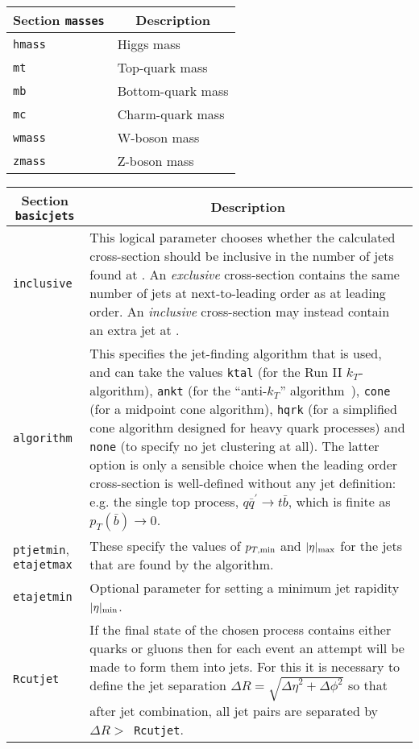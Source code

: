 	\begin{longtable}{p{1.5cm}p{12cm}}
		\toprule
		\multicolumn{1}{c}{{\textbf{Section} \texttt{masses}}} & \multicolumn{1}{c}{{\textbf{Description}}} \\ 
		\midrule
		\texttt{hmass} & Higgs mass \\
		\texttt{mt} & Top-quark mass \\
		\texttt{mb} & Bottom-quark mass \\
		\texttt{mc} & Charm-quark mass \\
		\texttt{wmass} & W-boson mass \\
		\texttt{zmass} & Z-boson mass \\
		\bottomrule
	\end{longtable}

	\begin{longtable}{p{1.5cm}p{12cm}}
		\toprule
		\multicolumn{1}{c}{{\textbf{Section} \texttt{basicjets}}} & \multicolumn{1}{c}{{\textbf{Description}}} \\ 
		\midrule
		\texttt{inclusive} &
		This logical parameter chooses whether the
		calculated cross-section should be inclusive in the number of jets
		found at \NLO{}. An {\em exclusive}
		cross-section contains the same number of jets at next-to-leading
		order as at leading order. An {\em inclusive} cross-section may
		instead contain an extra jet at \NLO{}. \\
		\texttt{algorithm} &
		This specifies the jet-finding algorithm that
		is used, and can take the values
		{\tt ktal} (for the Run II $k_T$-algorithm), {\tt ankt} (for the
		``anti-$k_T$'' algorithm~\cite{Cacciari:2008gp}), {\tt cone} (for
		a midpoint cone algorithm), {\tt hqrk} (for a simplified cone
		algorithm designed for heavy quark processes) and {\tt none} (to
		specify no jet clustering at all). The latter option is only a
		sensible choice when the leading order cross-section is well-defined
		without any jet definition: e.g. the single top process,
		$q{\bar q^\prime} \to t{\bar b}$, which is finite as
		$p_T({\bar b}) \to 0$. \\
		\texttt{ptjetmin}, \texttt{etajetmax} &
		These specify the values
		of $p_{T,{\rm min}}$ and $|\eta|_{\rm max}$ for the
		jets that are found by the algorithm.  \\
		\texttt{etajetmin} &
		Optional parameter for setting a minimum jet rapidity $|\eta|_{\rm min}$. \\
		\texttt{Rcutjet} &
		If the final state of the chosen process contains
		either quarks or gluons then for each event an attempt will be made
		to form them into jets. For this it is necessary to define the
		jet separation $\Delta R=\sqrt{{\Delta \eta}^2 + {\Delta \phi}^2}$
		so that after jet combination, all jet pairs are separated by
		$\Delta R >$~{\tt Rcutjet}.\\
		\bottomrule
	\end{longtable}


